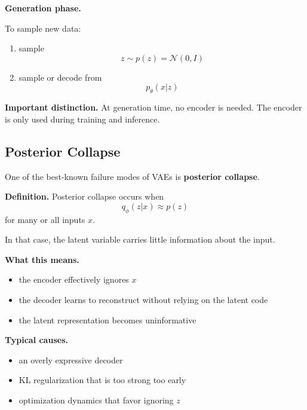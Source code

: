 \medskip

\noindent
\textbf{Generation phase.}

To sample new data:
\begin{enumerate}
    \item sample
    \[
    z \sim p(z)=\mathcal{N}(0,I)
    \]
    \item sample or decode from
    \[
    p_\theta(x|z)
    \]
\end{enumerate}

\medskip

\noindent
\textbf{Important distinction.}  
At generation time, no encoder is needed. The encoder is only used during training and inference.

\subsection{Posterior Collapse}

One of the best-known failure modes of VAEs is \textbf{posterior collapse}.

\medskip

\noindent
\textbf{Definition.}  
Posterior collapse occurs when
\[
q_\phi(z|x)\approx p(z)
\]
for many or all inputs $x$.

\medskip

\noindent
In that case, the latent variable carries little information about the input.

\medskip

\noindent
\textbf{What this means.}

\begin{itemize}
    \item the encoder effectively ignores $x$
    \item the decoder learns to reconstruct without relying on the latent code
    \item the latent representation becomes uninformative
\end{itemize}

\medskip

\noindent
\textbf{Typical causes.}

\begin{itemize}
    \item an overly expressive decoder
    \item KL regularization that is too strong too early
    \item optimization dynamics that favor ignoring $z$
\end{itemize}

